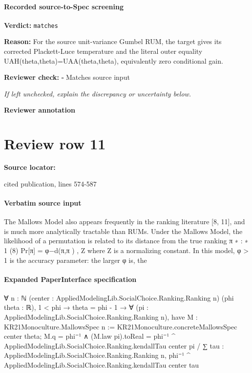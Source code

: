 \documentclass[10pt]{article}
\newcommand{\reviewerbox}{%
  \par\noindent\fbox{\parbox{0.96\linewidth}{\rule{0pt}{0.38in}}}\par
}
\newcommand{\reviewmatch}[1]{%
  \par\noindent\textbf{Reviewer check:} $\square$\; #1\par
  \noindent\emph{If left unchecked, explain the discrepancy or uncertainty below.}\par
}
\begin{document}
\paragraph{Recorded source-to-Spec screening}
\textbf{Verdict:} \texttt{matches}
\\
{\raggedright
\textbf{Reason:} For the source unit-\allowbreak{}variance Gumbel RUM, the target gives its corrected Plackett-\allowbreak{}Luce temperature and the literal outer equality UAH(theta,theta)=UAA(theta,theta), equivalently zero conditional gain.\allowbreak{}
\par}
\reviewmatch{Matches source input}
\noindent\textbf{Reviewer annotation}\par
\reviewerbox
\clearpage
\hypertarget{source-claim-8dd2c310e7ffc8a6}{}
\section*{Review row 11}
\textbf{Source locator:} {\footnotesize\raggedright cited publication, lines 574-\allowbreak{}587\par}
\paragraph{Verbatim source input}
\begin{ReviewVerbatim}
The Mallows Model also appears frequently in the ranking literature [8, 11], and is much more analytically
tractable than RUMs. Under the Mallows Model, the likelihood of a permutation is related to its distance
from the true ranking π ∗ :
∗
1
(8)
Pr[π] = φ−d(π,π ) ,
Z
where Z is a normalizing constant. In this model, φ > 1 is the accuracy parameter: the larger φ is, the
\end{ReviewVerbatim}



\paragraph{Expanded PaperInterface specification}
\begin{ReviewVerbatim}
∀ {n : ℕ} (center : AppliedModelingLib.SocialChoice.Ranking.Ranking n) (phi theta : ℝ),
  1 < phi →
    theta = phi - 1 →
      ∀ (pi : AppliedModelingLib.SocialChoice.Ranking.Ranking n),
        have M : KR21Monoculture.MallowsSpec n := KR21Monoculture.concreteMallowsSpec center theta;
        M.q = phi⁻¹ ∧
          (M.law pi).toReal =
            phi⁻¹ ^ AppliedModelingLib.SocialChoice.Ranking.kendallTau center pi /
              ∑ tau : AppliedModelingLib.SocialChoice.Ranking.Ranking n,
                phi⁻¹ ^ AppliedModelingLib.SocialChoice.Ranking.kendallTau center tau
\end{ReviewVerbatim}
\end{document}

